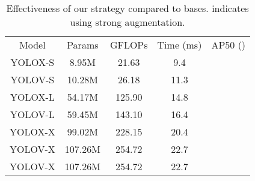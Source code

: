 \documentclass[letterpaper]{article} \usepackage{aaai23}  \usepackage{times}  \usepackage{helvet}  \usepackage{courier}  \usepackage[hyphens]{url}  \usepackage{graphicx} \urlstyle{rm} \def\UrlFont{\rm}  \usepackage{natbib}  \usepackage{caption} \usepackage{xcolor}
\begin{document}
\setlength{\tabcolsep}{4pt}
\begin{table}[t]
\begin{center}
\begin{tabular}{c|cccc}
\hline\noalign{\smallskip}
Model&Params&GFLOPs&Time (ms)&AP50 ()\\
\noalign{\smallskip}
\hline
\noalign{\smallskip}


YOLOX-S & 8.95M & 21.63 & 9.4 &\\
YOLOV-S & 10.28M & 26.18 & 11.3 & \\
YOLOX-L & 54.17M & 125.90 & 14.8 &  \\
YOLOV-L & 59.45M & 143.10 & 16.4 &   \\
YOLOX-X & 99.02M & 228.15 & 20.4 & \\
YOLOV-X & 107.26M & 254.72 & 22.7 & \\
YOLOV-X & 107.26M & 254.72 & 22.7 & \\

\hline
\end{tabular}
\end{center}
\caption{Effectiveness of our strategy compared to bases.  indicates using strong augmentation.}
\label{table:effectiveness of diff model}
\end{table}
\setlength{\tabcolsep}{1.4pt}
\end{document}
